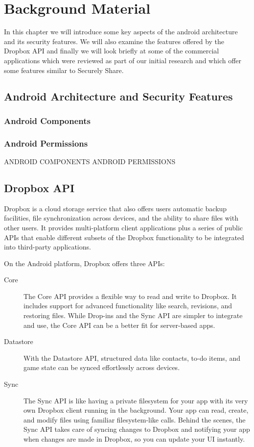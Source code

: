
\chapter{Background Material}
\label{cha:background}

In this chapter we will introduce some key aspects of the android architecture and its security features.  We will also examine the features offered by the Dropbox API and finally we will look briefly at some of the commercial applications which were reviewed as part of our initial research and which offer some features similar to Securely Share.

\section{Android Architecture and Security Features}
\subsection{Android Components}
\subsection{Android Permissions}

ANDROID COMPONENTS
ANDROID PERMISSIONS
\section{Dropbox API}
\label{sec:dropbox}
Dropbox is a cloud storage service that also offers users  automatic backup facilities, file synchronization across devices, and the ability to share files with other users.  It provides multi-platform client applications plus a series of public APIs that enable different subsets of the Dropbox functionality to be integrated into third-party applications.  

On the Android platform, Dropbox offers three APIs:
\begin{description}
	\item[Core] The Core API provides a flexible way to read and write to Dropbox. It includes support for advanced functionality like search, revisions, and restoring files. While Drop-ins and the Sync API are simpler to integrate and use, the Core API can be a better fit for server-based apps.
	\item[Datastore] With the Datastore API, structured data like contacts, to-do items, and game state can be synced effortlessly across devices.
	\item[Sync] The Sync API is like having a private filesystem for your app with its very own Dropbox client running in the background. Your app can read, create, and modify files using familiar filesystem-like calls. Behind the scenes, the Sync API takes care of syncing changes to Dropbox and notifying your app when changes are made in Dropbox, so you can update your UI instantly.
\end{description}

